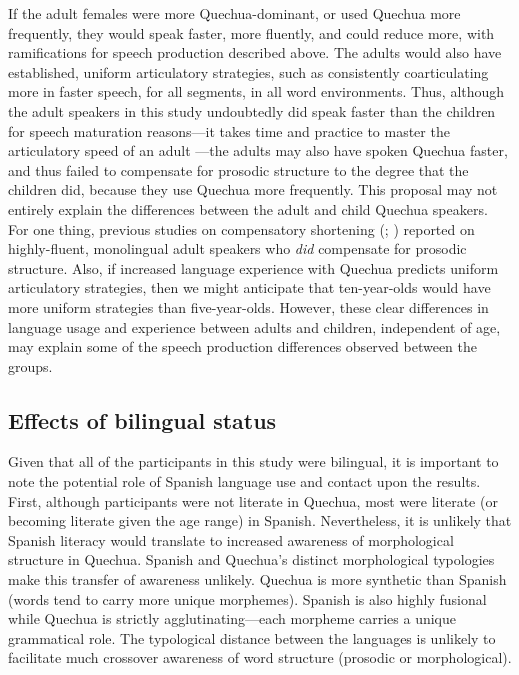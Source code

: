 \documentclass[a4paper,man,floatsintext,natbib,donotrepeattitle, apacite]{apa6}
\begin{document}
If the adult females were more Quechua-dominant, or used Quechua more frequently, they would speak faster, more fluently, and could reduce more, with ramifications for speech production described above. The adults would also have established, uniform articulatory strategies, such as consistently coarticulating more in faster speech, for all segments, in all word environments. Thus, although the adult speakers in this study undoubtedly did speak faster than the children for speech maturation reasons---it takes time and practice to master the articulatory speed of an adult \citep{leeAcousticsChildrenSpeech1999}---the adults may also have spoken Quechua faster, and thus failed to compensate for prosodic structure to the degree that the children did, because they use Quechua more frequently. This proposal may not entirely explain the differences between the adult and child Quechua speakers. For one thing, previous studies on compensatory shortening (\citealt{lehisteTimingUtterancesLinguistic1972}; \citealt{munhallCompensatoryShorteningMonosyllables1992}) reported on highly-fluent, monolingual adult speakers who \textit{did} compensate for prosodic structure. Also, if increased language experience with Quechua predicts uniform articulatory strategies, then we might anticipate that ten-year-olds would have more uniform strategies than five-year-olds. However, these clear differences in language usage and experience between adults and children, independent of age, may explain some of the speech production differences observed between the groups. 

\subsection{Effects of bilingual status}

Given that all of the participants in this study were bilingual, it is important to note the potential role of Spanish language use and contact upon the results. First, although participants were not literate in Quechua, most were literate (or becoming literate given the age range) in Spanish. Nevertheless, it is unlikely that Spanish literacy would translate to increased awareness of morphological structure in Quechua. Spanish and Quechua's distinct morphological typologies make this transfer of awareness unlikely. Quechua is more synthetic than Spanish (words tend to carry more unique morphemes). Spanish is also highly fusional while Quechua is strictly agglutinating---each morpheme carries a unique grammatical role. The typological distance between the languages is unlikely to facilitate much crossover awareness of word structure (prosodic or morphological). 
\end{document}
